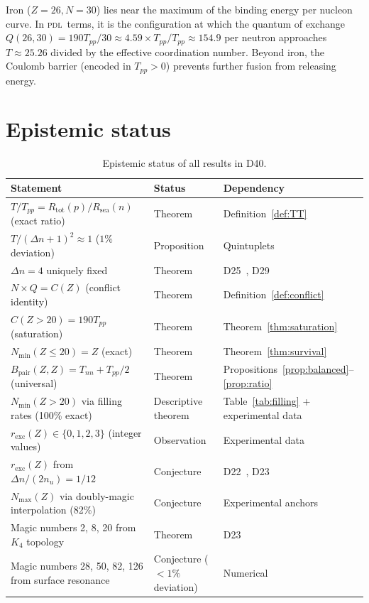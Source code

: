 \documentclass{article}
\theoremstyle{remark}
\newcommand{\PDL}{\textsc{pdl}}
\newcommand{\Kfour}{K_4}
\newcommand{\Rsea}{R_{\mathrm{sea}}}
\newcommand{\Rtot}{R_{\mathrm{tot}}}
\newcommand{\Tpp}{T_{pp}}
\newcommand{\Tnn}{T_{nn}}
\newcommand{\Nmin}{N_{\min}}
\newcommand{\Nmax}{N_{\max}}
\newcommand{\Deltanop}{\Delta n}
\newcommand{\Bpair}{B_{\mathrm{pair}}}
\begin{document}
Iron ($Z = 26, N = 30$) lies near the maximum of the binding energy per nucleon curve. In \PDL\ terms, it is the configuration at which the quantum of exchange $Q(26, 30) = 190\Tpp/30 \approx 4.59 \times \Tpp/\Tpp \approx 154.9$ per neutron approaches $T \approx 25.26$ divided by the effective coordination number. Beyond iron, the Coulomb barrier (encoded in $\Tpp > 0$) prevents further fusion from releasing energy.

\section{Epistemic status}
\label{sec:epistemic}

\begin{table}[ht]
\centering
\caption{Epistemic status of all results in D40.}
\label{tab:epistemic}
\small
\begin{tabular}{>{\raggedright\arraybackslash}p{6cm} p{3.5cm} p{4cm}}
\toprule
Statement & Status & Dependency \\
\midrule
$T/\Tpp = \Rtot(p)/\Rsea(n)$ (exact ratio) & Theorem & Definition~\ref{def:TT} \\[3pt]
$T/(\Deltanop+1)^2 \approx 1$ ($1\%$ deviation) & Proposition & Quintuplets \\[3pt]
$\Deltanop = 4$ uniquely fixed & Theorem & D25~\cite{D25}, D29~\cite{D29} \\[3pt]
$N \times Q = C(Z)$ (conflict identity) & Theorem & Definition~\ref{def:conflict} \\[3pt]
$C(Z > 20) = 190\Tpp$ (saturation) & Theorem & Theorem~\ref{thm:saturation} \\[3pt]
$\Nmin(Z \leq 20) = Z$ (exact) & Theorem & Theorem~\ref{thm:survival} \\[3pt]
$\Bpair(Z,Z) = \Tnn + \Tpp/2$ (universal) & Theorem & Propositions~\ref{prop:balanced}--\ref{prop:ratio} \\[3pt]
$\Nmin(Z > 20)$ via filling rates (100\% exact) & Descriptive theorem & Table~\ref{tab:filling} + experimental data \\[3pt]
$r_{\mathrm{exc}}(Z) \in \{0,1,2,3\}$ (integer values) & Observation & Experimental data \\[3pt]
$r_{\mathrm{exc}}(Z)$ from $\Deltanop/(2n_u) = 1/12$ & Conjecture & D22~\cite{D22}, D23~\cite{D23} \\[3pt]
$\Nmax(Z)$ via doubly-magic interpolation (82\%) & Conjecture & Experimental anchors \\[3pt]
Magic numbers 2, 8, 20 from $\Kfour$ topology & Theorem & D23~\cite{D23} \\[3pt]
Magic numbers 28, 50, 82, 126 from surface resonance & Conjecture ($<1\%$ deviation) & Numerical \\[3pt]
\bottomrule
\end{tabular}
\end{table}
\end{document}
